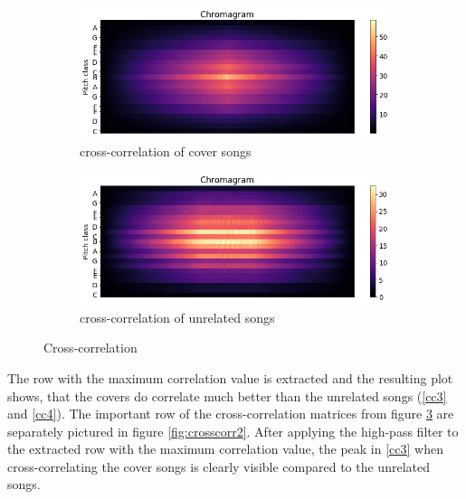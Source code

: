 \begin{figure}[htbp]
{{			\begin{subfigure}{.495\textwidth}
				\centering    
				\includegraphics[scale=0.3]{Images/Chroma/cross_hurricane.png}
				\caption{cross-correlation of cover songs}
				\label{cc1}
			\end{subfigure}		
			\begin{subfigure}{.495\textwidth}
				\centering     
				\includegraphics[scale=0.3]{Images/Chroma/cross_hurricane_sia.png}
				\caption{cross-correlation of unrelated songs}
				\label{cc2}
			\end{subfigure}%
	}}
	\caption{Cross-correlation}
	\label{fig:crosscorr}
\end{figure}
The row with the maximum correlation value is extracted and the resulting plot shows, that the covers do correlate much better than the unrelated songs (\ref{cc3} and \ref{cc4}).
The important row of the cross-correlation matrices from figure \ref{fig:crosscorr} are separately pictured in figure \ref{fig:crosscorr2}. After applying the high-pass filter to the extracted row with the maximum correlation value, the peak in \ref{cc3} when cross-correlating the cover songs is clearly visible compared to the unrelated songs.

